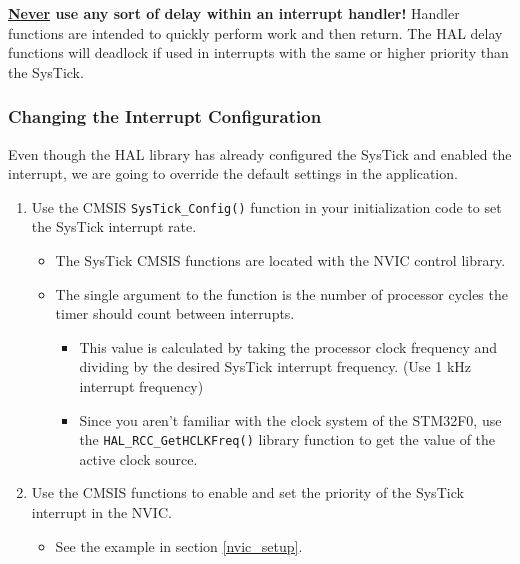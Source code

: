 \documentclass[11pt,fleqn]{book} %
\begin{document}
\begin{warning}
    \textbf{\underline{Never} use any sort of delay within an interrupt handler!} Handler functions are intended to quickly perform work and then return. The HAL delay functions will deadlock if used in interrupts with the same or higher priority than the SysTick.
\end{warning}

\subsubsection{Changing the Interrupt Configuration}
Even though the HAL library has already configured the SysTick and enabled the interrupt, we are going to override the default settings in the application. 

\begin{enumerate}
    \item Use the CMSIS \texttt{SysTick\_Config()} function in your initialization code to set the SysTick interrupt rate. 
    \begin{itemize}
        \item The SysTick CMSIS functions are located with the NVIC control library.
        \item The single argument to the function is the number of processor cycles the timer should count between interrupts. 
        \begin{itemize}
            \item This value is calculated by taking the processor clock frequency and dividing by the desired SysTick interrupt frequency. (Use 1 kHz interrupt frequency)
            \item Since you aren't familiar with the clock system of the STM32F0, use the \texttt{HAL\_RCC\_GetHCLKFreq()} library function to get the value of the active clock source. 
        \end{itemize}
    \end{itemize}
    \item Use the CMSIS functions to enable and set the priority of the SysTick interrupt in the NVIC. 
    \begin{itemize}
        \item See the example in section \ref{nvic_setup}.
    \end{itemize}
\end{enumerate}


\end{document}
